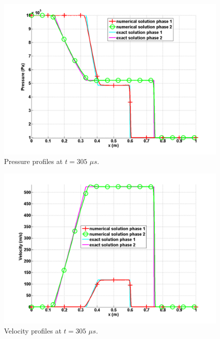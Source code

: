 \begin{figure}[H]
\centering
\includegraphics[width=\textwidth]{figures/SEM/two_phases_pressure.png}
\caption{Pressure profiles at $t=305$ $\mu s$.}
\label{fig:two-indep-fluids-press-7-eqn-sect4}
\end{figure}
%
\begin{figure}[H]
\centering
\includegraphics[width=\textwidth]{figures/SEM/two_phases_velocity.png}
\caption{Velocity profiles at $t=305$ $\mu s$.}
\label{fig:two-indep-fluids-vel-7-eqn-sect4}
\end{figure}
%
